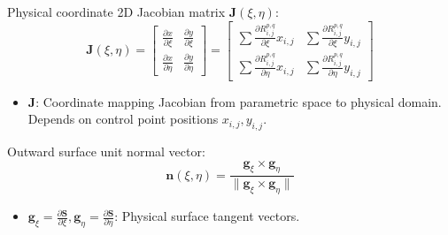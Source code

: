 \documentclass[12pt,a4paper,oneside]{report}
\newcommand{\vect}[1]{\mathbf{#1}}
\newcommand{\mat}[1]{\mathbf{#1}}
\begin{document}
Physical coordinate 2D Jacobian matrix $\mat{J}(\xi, \eta)$:
\begin{equation}
    \mat{J}(\xi, \eta) = \begin{bmatrix} \frac{\partial x}{\partial \xi} & \frac{\partial y}{\partial \xi} \\[0.3em] \frac{\partial x}{\partial \eta} & \frac{\partial y}{\partial \eta} \end{bmatrix} = \begin{bmatrix} \sum \frac{\partial R_{i,j}^{p,q}}{\partial \xi} x_{i,j} & \sum \frac{\partial R_{i,j}^{p,q}}{\partial \xi} y_{i,j} \\[0.5em] \sum \frac{\partial R_{i,j}^{p,q}}{\partial \eta} x_{i,j} & \sum \frac{\partial R_{i,j}^{p,q}}{\partial \eta} y_{i,j} \end{bmatrix}
\end{equation}
\begin{tcolorbox}[colback=gray!5!white,colframe=gray!60!black,title={Term Definitions \& Parameter Dependencies}]
\begin{itemize}
    \item $\mat{J}$: Coordinate mapping Jacobian from parametric space to physical domain. Depends on control point positions $x_{i,j}, y_{i,j}$.
\end{itemize}
\end{tcolorbox}

Outward surface unit normal vector:
\begin{equation}
    \vect{n}(\xi, \eta) = \frac{\vect{g}_{\xi} \times \vect{g}_{\eta}}{\|\vect{g}_{\xi} \times \vect{g}_{\eta}\|}
\end{equation}
\begin{tcolorbox}[colback=gray!5!white,colframe=gray!60!black,title={Term Definitions \& Parameter Dependencies}]
\begin{itemize}
    \item $\vect{g}_{\xi} = \frac{\partial \vect{S}}{\partial \xi}, \vect{g}_{\eta} = \frac{\partial \vect{S}}{\partial \eta}$: Physical surface tangent vectors.
\end{itemize}
\end{tcolorbox}
\end{document}
